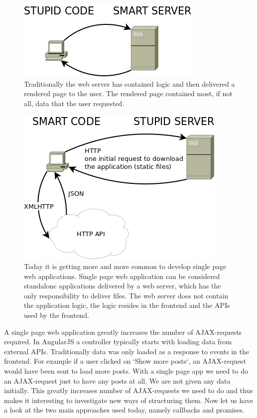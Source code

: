 \documentclass[a4paper,12pt]{article}
\begin{document}
\begin{figure}[!htbp]
  \includegraphics[scale=0.5]{traditional_cs_model.png}
  \caption{
    Traditionally the web server has contained logic and then delivered a rendered page to the user.
    The rendered page contained most, if not all, data that the user requested.
  }
\end{figure}

\begin{figure}[!htbp]
  \includegraphics[scale=0.5]{new_cs_model.png}
  \caption{
    Today it is getting more and more common to develop single page web applications. 
    Single page web application can be considered standalone applications delivered by a web server, which has the only responsibility to deliver files.
    The web server does not contain the application logic, the logic resides in the frontend and the APIs used by the frontend.
  }
\end{figure}

A single page web application greatly increases the number of AJAX-requests required. In AngularJS a controller typically
starts with loading data from external APIs. Traditionally data was only loaded as a response to events in the frontend.
For example if a user clicked on `Show more posts`, an AJAX-request would have been sent to load more posts.
With a single page app we need to do an AJAX-request just to have any posts at all. We are not given any data initially.
This greatly increases number of AJAX-requests we need to do and thus makes it interesting to investigate new ways of structuring them.
Now let us have a look at the two main approaches used today, namely callbacks and promises.
\end{document}
